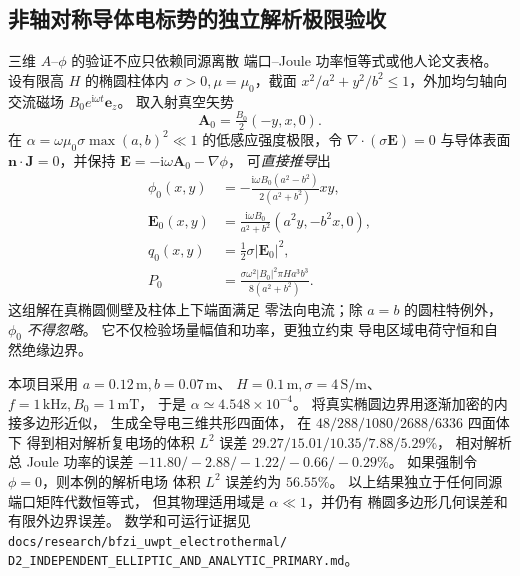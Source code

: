 \subsection{非轴对称导体电标势的独立解析极限验收}
\label{sec:bfzi-d2-elliptic-limit}

三维 $A$--$\phi$ 的验证不应只依赖同源离散
端口--Joule 功率恒等式或他人论文表格。
设有限高 $H$ 的椭圆柱体内
$\sigma>0,\mu=\mu_0$，截面
$x^2/a^2+y^2/b^2\leq1$，外加均匀轴向交流磁场
$B_0e^{\mathrm i\omega t}\bm e_z$。
取入射真空矢势
\begin{equation}
 \bm A_0=\tfrac{B_0}{2}(-y,x,0).
\end{equation}
在 $\alpha=\omega\mu_0\sigma\max(a,b)^2\ll1$
的低感应强度极限，令
$\nabla\cdot(\sigma\bm E)=0$ 与导体表面
$\bm n\cdot\bm J=0$，并保持
$\bm E=-\mathrm i\omega\bm A_0-\nabla\phi$，
可\emph{直接推导}出
\begin{align}
 \phi_0(x,y)&=
  -\frac{\mathrm i\omega B_0(a^2-b^2)}
   {2(a^2+b^2)}xy,\\
 \bm E_0(x,y)&=
  \frac{\mathrm i\omega B_0}{a^2+b^2}
    (a^2y,-b^2x,0),\\
 q_0(x,y)&=\tfrac12\sigma|\bm E_0|^2,\\
 P_0&=\frac{\sigma\omega^2|B_0|^2
         \pi H a^3b^3}{8(a^2+b^2)}.
\end{align}
这组解在真椭圆侧壁及柱体上下端面满足
零法向电流；除 $a=b$ 的圆柱特例外，
$\phi_0$ \emph{不得忽略}。
它不仅检验场量幅值和功率，更独立约束
导电区域电荷守恒和自然绝缘边界。

本项目采用 $a=0.12\,\mathrm m,b=0.07\,\mathrm m$、
$H=0.1\,\mathrm m,\sigma=4\,\mathrm{S/m}$、
$f=1\,\mathrm{kHz},B_0=1\,\mathrm{mT}$，
于是 $\alpha\simeq4.548\times10^{-4}$。
将真实椭圆边界用逐渐加密的内接多边形近似，
生成全导电三维共形四面体，
在 $48/288/1080/2688/6336$ 四面体下
得到相对解析复电场的体积 $L^2$ 误差
$29.27/15.01/10.35/7.88/5.29\%$，
相对解析总 Joule 功率的误差
$-11.80/-2.88/-1.22/-0.66/-0.29\%$。
如果强制令 $\phi=0$，则本例的解析电场
体积 $L^2$ 误差约为 $56.55\%$。
以上结果独立于任何同源端口矩阵代数恒等式，
但其物理适用域是 $\alpha\ll1$，并仍有
椭圆多边形几何误差和有限外边界误差。
数学和可运行证据见
\texttt{docs/research/bfzi\_uwpt\_electrothermal/
D2\_INDEPENDENT\_ELLIPTIC\_AND\_ANALYTIC\_PRIMARY.md}。

